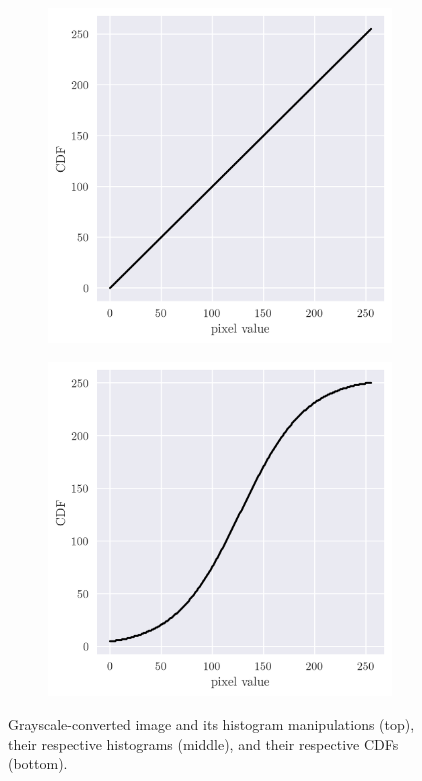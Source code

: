\documentclass[12pt,a4paper]{article}
\begin{document}
\begin{figure}[htb]
\begin{subfigure}[h!]{0.24\textwidth}
		\caption{}
		\label{fig:cs-cdf}
	\end{subfigure}
	\begin{subfigure}[h!]{0.24\textwidth}
		\centering
		\includegraphics[width=\textwidth]{uniform_cdf.png}
		\caption{}
		\label{fig:histeq-cdf}
	\end{subfigure}
	\begin{subfigure}[h!]{0.24\textwidth}
		\centering
		\includegraphics[width=\textwidth]{sigmoid_cdf.png}
		\caption{}
		\label{fig:adapteq-cdf}
	\end{subfigure}
	\caption{Grayscale-converted image and its histogram manipulations (top), their respective histograms (middle), and their respective CDFs (bottom).}
	\label{fig:images}
\end{figure}
\end{document}
